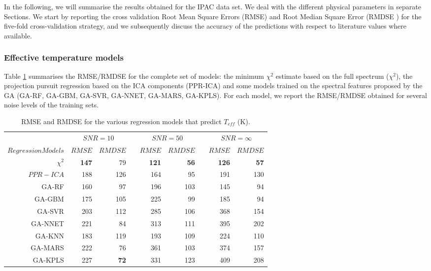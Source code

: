 
In the following, we will summarise the results obtained for the IPAC
data set. We deal with the different physical parameters in separate
Sections. We start by reporting the cross validation Root Mean Square
Errors (RMSE) and Root Median Square Error (RMDSE ) for the five-fold
cross-validation strategy, and we subsequently discuss the accuracy of
the predictions with respect to literature values where available.

\subsubsection{Effective temperature models}

Table \ref{tab:model_TSD_IPAC} summarises the RMSE/RMDSE for the
complete set of models: the minimum $\chi^2$ estimate based on the
full spectrum ($\chi^2$), the projection pursuit regression based on
the ICA components (PPR-ICA) and some models trained on the spectral
features proposed by the GA (GA-RF, GA-GBM, GA-SVR, GA-NNET, GA-MARS,
GA-KPLS). For each model, we report the RMSE/RMDSE obtained for
several noise levels of the training sets.

% 
\begin{table}\centering
{}
\begin{tabular}{@{}rrrcrrcrr@{}}\toprule
& \multicolumn{2}{c}{$SNR = 10$} & \phantom{ab}& \multicolumn{2}{c}{$SNR = 50$} &
\phantom{ab} & \multicolumn{2}{c}{$SNR = \infty$}\\
\cmidrule{2-3} \cmidrule{5-6} \cmidrule{8-9}
$Regression Models$ & $RMSE$ & $RMDSE$ && $RMSE$ & $RMDSE$ && $RMSE$ & $RMDSE$ \\ \midrule
$\chi^2$    & {\bf 147} & 79       && {\bf 121} & {\bf 56}  && {\bf 126} & {\bf 57} \\
$ PPR-ICA$  & 188       & 126      && 164       & 95        && 191       & 130 \\
GA-RF       & 160       & 97       && 196       & 103       && 145       & 94 \\
GA-GBM      & 175       & 105      && 225       & 99        && 185       & 94 \\
GA-SVR      & 203       & 112      && 285       & 106       && 368       & 154 \\
GA-NNET     & 221       & 84       && 313       & 111       && 395       & 202 \\
GA-KNN      & 183       & 119      && 193       & 109       && 224       & 110  \\
GA-MARS     & 222       & 76       && 361       & 103       && 374       & 157 \\
GA-KPLS     & 227       & {\bf 72} && 331       & 123       && 409       & 208 \\
\bottomrule
\end{tabular}
\caption {RMSE and RMDSE for the various regression models that predict $T_{eff}$ (K).} 
\label{tab:model_TSD_IPAC} 
\end{table}

